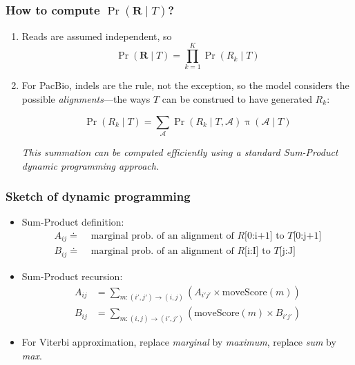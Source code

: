 \documentclass[serif,11pt]{beamer}
\begin{document}
\begin{frame}
\frametitle{How to compute $\Pr(\mathbf{R} \mid T)$?}
\label{sec-2-4}


\begin{enumerate}
\item Reads are assumed independent, so
      $$\Pr(\mathbf{R} \mid T) = \prod_{k=1}^{K}\Pr(R_k \mid T)$$
\item For PacBio, indels are the rule, not the exception, so the model
      considers the possible \emph{alignments}---the ways $T$ can be
      construed to have generated $R_k$:

      $$\Pr(R_k \mid T) = \sum_\mathcal{A} \Pr(R_k \mid T, \mathcal{A}) \mathop{\pi}(\mathcal{A} \mid T)$$

      \emph{This summation can be computed efficiently using a standard Sum-Product dynamic programming approach.}
\end{enumerate}
\end{frame}
\begin{frame}
\frametitle{Sketch of dynamic programming}
\label{sec-2-5}

\begin{itemize}
\item Sum-Product definition:
     \begin{align*}
     A_{ij} \doteq&
     \text{ marginal prob. of an alignment of $R$[0:i+1] to $T$[0:j+1]} \\
     B_{ij} \doteq&
     \text{ marginal prob. of an alignment of $R$[i:I] to $T$[j:J]}
     \end{align*}
\item Sum-Product recursion:
   \begin{align*}
   A_{ij} &= \sum_{m: (i',j') \to (i, j)}   (A_{i'j'} \times \mathrm{moveScore}(m)) \\
   B_{ij} &= \sum_{m: (i, j)  \to (i', j')} (\mathrm{moveScore}(m) \times B_{i'j'})
   \end{align*}
\item For Viterbi approximation, replace \emph{marginal} by \emph{maximum}, replace \emph{sum}
   by \emph{max}.
\end{itemize}
\end{frame}
\end{document}

